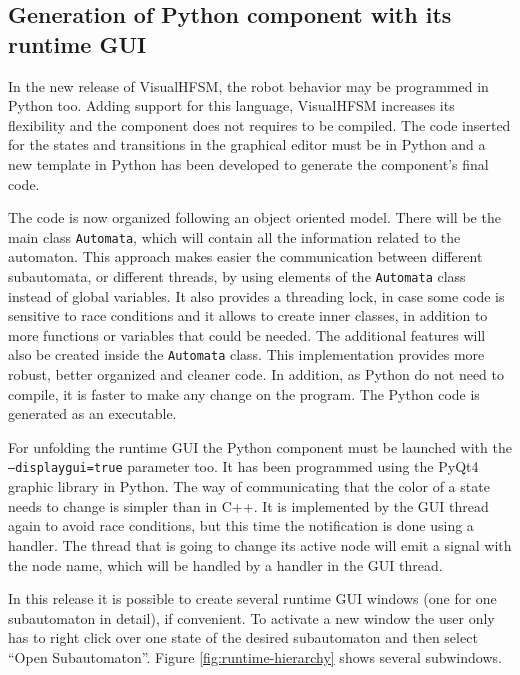 \documentclass[journal,twoside]{JoPhA}
\begin{document}
\subsection{Generation of Python component with its runtime GUI}

In the new release of VisualHFSM, the robot behavior may be programmed in Python too. Adding support for this language, VisualHFSM increases its flexibility and the component does not requires to be compiled. The code inserted for the states and transitions in the graphical editor must be in Python and a new template in Python has been developed to generate the component's final code. 

The code is now organized following an object oriented model. There will be the main class \texttt{Automata}, which will contain all the information related to the automaton. This approach makes easier the communication between different subautomata, or different threads, by using elements of the \texttt{Automata} class instead of global variables. It also provides a threading lock, in case some code is sensitive to race conditions and it allows to create inner classes, in addition to more functions or variables that could be needed. The additional features will also be created inside the \texttt{Automata} class. This implementation provides more robust, better organized and cleaner code. In addition, as Python do not need to compile, it is faster to make any change on the program. The Python code is generated as an executable. %

For unfolding the runtime GUI the Python component must be launched with the \texttt{--displaygui=true} parameter too. It has been programmed using the PyQt4  graphic library in Python. The way of communicating that the color of a state needs to change is simpler than in C++. It is implemented by the GUI thread again to avoid race conditions, but this time the notification is done using a handler. The thread that is going to change its active node will emit a signal with the node name, which will be handled by a handler in the GUI thread. 

In this release it is possible to create several runtime GUI windows (one for one subautomaton in detail), if convenient. To activate a new window the user only has to right click over one state of the desired subautomaton and then select “Open Subautomaton”. Figure \ref{fig:runtime-hierarchy} shows several subwindows.
\end{document}
